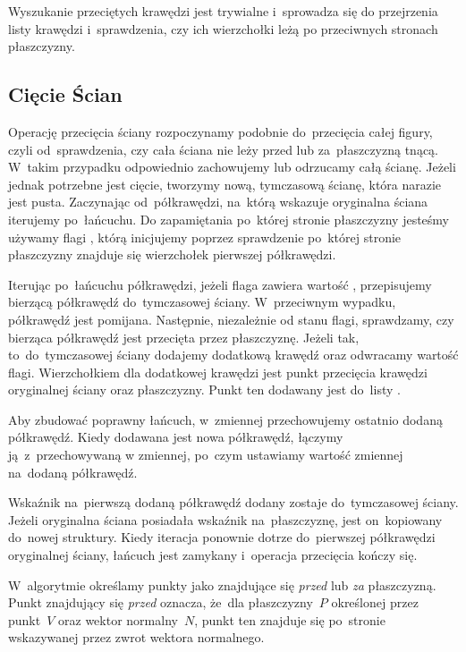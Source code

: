 \documentclass[skorowidz,autorrok,backref,xodstep,oswiadczenie]{wmimgr}
\begin{document}
Wyszukanie przeciętych krawędzi jest trywialne i~sprowadza się do przejrzenia listy krawędzi i~sprawdzenia, czy ich wierzchołki leżą po przeciwnych stronach płaszczyzny.

\subsection{Cięcie Ścian}

Operację przecięcia ściany rozpoczynamy podobnie do~przecięcia całej figury, czyli od~sprawdzenia, czy cała ściana nie leży przed lub za~płaszczyzną tnącą. W~takim przypadku odpowiednio zachowujemy lub odrzucamy całą ścianę. Jeżeli jednak potrzebne jest cięcie, tworzymy nową, tymczasową ścianę, która narazie jest pusta. Zaczynając od~półkrawędzi, na~którą wskazuje oryginalna ściana iterujemy po~łańcuchu. Do zapamiętania po~której stronie płaszczyzny jesteśmy używamy flagi , którą inicjujemy poprzez sprawdzenie po~której stronie płaszczyzny znajduje się wierzchołek pierwszej półkrawędzi.

Iterując po~łańcuchu półkrawędzi, jeżeli flaga  zawiera wartość , przepisujemy bierzącą półkrawędź do~tymczasowej ściany. W~przeciwnym wypadku, półkrawędź jest pomijana. Następnie, niezależnie od stanu flagi, sprawdzamy, czy bierząca półkrawędź jest przecięta przez płaszczyznę. Jeżeli tak, to~do~tymczasowej ściany dodajemy dodatkową krawędź oraz odwracamy wartość flagi. Wierzchołkiem dla dodatkowej krawędzi jest punkt przecięcia krawędzi oryginalnej ściany oraz płaszczyzny. Punkt ten dodawany jest do~listy .

Aby zbudować poprawny łańcuch, w~zmiennej  przechowujemy ostatnio dodaną półkrawędź. Kiedy dodawana jest nowa półkrawędź, łączymy ją~z~przechowywaną w zmiennej, po~czym ustawiamy wartość zmiennej na~dodaną półkrawędź.

Wskaźnik na~pierwszą dodaną półkrawędź dodany zostaje do~tymczasowej ściany. Jeżeli oryginalna ściana posiadała wskaźnik na~płaszczyznę, jest on~kopiowany do~nowej struktury. Kiedy iteracja ponownie dotrze do~pierwszej półkrawędzi oryginalnej ściany, łańcuch jest zamykany i~operacja przecięcia kończy się.

W~algorytmie określamy punkty jako znajdujące się \emph{przed} lub \emph{za} płaszczyzną. Punkt znajdujący się \emph{przed} oznacza, że~dla płaszczyzny~$P$ określonej przez punkt~$V$ oraz wektor normalny~$N$, punkt ten znajduje się po~stronie wskazywanej przez zwrot wektora normalnego.
\end{document}
